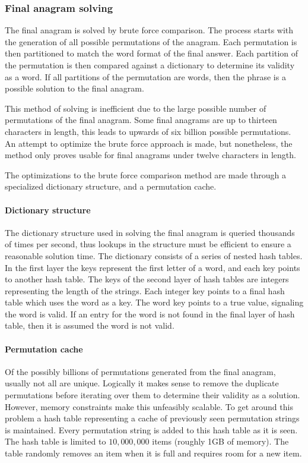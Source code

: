 \documentclass{article}
\begin{document}
	 \subsubsection{Final anagram solving}
	 The final anagram is solved by brute force comparison. The process starts with the generation of all possible permutations of the anagram.  Each permutation is then partitioned to match the word format of the final answer.  Each partition of the permutation is then compared against a dictionary to determine its validity as a word.  If all partitions of the permutation are words, then the phrase is a possible solution to the final anagram.\par\hspace{10pt}
	 This method of solving is inefficient due to the large possible number of permutations of the final anagram.  Some final anagrams are up to thirteen characters in length, this leads to upwards of six billion possible permutations.  An attempt to optimize the brute force approach is made, but nonetheless, the method only proves usable for final anagrams under twelve characters in length. \par \hspace{10pt}
	 The optimizations to the brute force comparison method are made through a specialized dictionary structure, and a permutation cache.
	 
	 \paragraph{Dictionary structure}
	 The dictionary structure used in solving the final anagram is queried thousands of times per second, thus lookups in the structure must be efficient to ensure a reasonable solution time. The dictionary consists of a series of nested hash tables.  In the first layer the keys represent the first letter of a word, and each key points to another hash table.  The keys of the second layer of hash tables are integers representing the length of the strings.  Each integer key points to a final hash table which uses the word as a key.  The word key points to a true value, signaling the word is valid.  If an entry for the word is not found in the final layer of hash table, then it is assumed the word is not valid.
	 
	 \paragraph{Permutation cache}
	 Of the possibly billions of permutations generated from the final anagram, usually not all are unique.  Logically it makes sense to remove the duplicate permutations before iterating over them to determine their validity as a solution.  However, memory constraints make this unfeasibly scalable.  To get around this problem a hash table representing a cache of previously seen permutation strings is maintained. Every permutation string is added to this hash table as it is seen. The hash table is limited to $10,000,000$ items (roughly 1GB of memory).  The table randomly removes an item when it is full and requires room for a new item.\par 
	 
\end{document}
